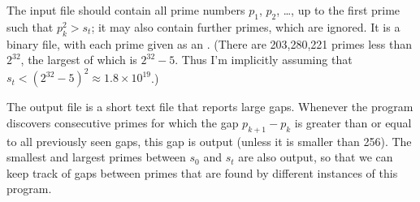 The input file should contain
all prime numbers $p_1$, $p_2$, \dots, up to the first prime such
that $p_k^2>s_t$; it may also contain further primes, which are ignored.
It is a binary file, with each prime given as an .
(There are 203,280,221 primes less than $2^{32}$, the largest of which
is $2^{32}-5$. Thus I'm implicitly assuming that $s_t<(2^{32}-5)^2
\approx 1.8\times10^{19}$.)

The output file is a short text file that reports large gaps.
Whenever the program discovers consecutive primes for which the gap
$p_{k+1}-p_k$ is greater than or equal to all previously seen gaps,
this gap is output (unless it is smaller than 256).
The smallest and largest
primes between $s_0$ and $s_t$ are also output, so that we can keep
track of gaps between primes that are
found by different instances of this program.

